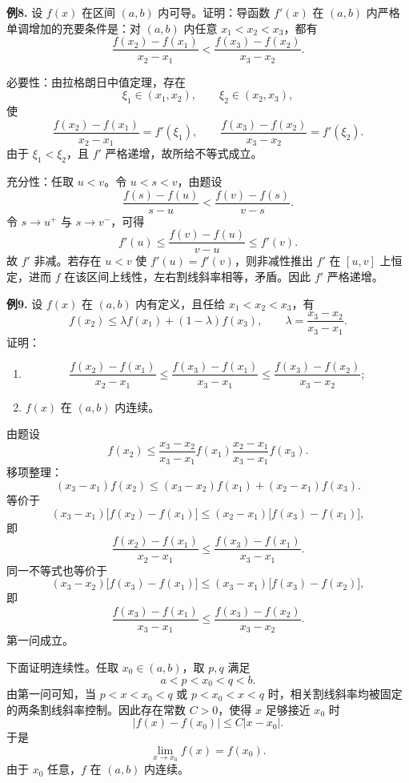 \begin{problemblock}
\textbf{例8.} 设 \(f(x)\) 在区间 \((a,b)\) 内可导。证明：导函数 \(f'(x)\) 在 \((a,b)\) 内严格单调增加的充要条件是：对 \((a,b)\) 内任意 \(x_1<x_2<x_3\)，都有
\[
\frac{f(x_2)-f(x_1)}{x_2-x_1}
<
\frac{f(x_3)-f(x_2)}{x_3-x_2}.
\]
\end{problemblock}
\begin{solutionblock}
必要性：由拉格朗日中值定理，存在
\[
\xi_1\in(x_1,x_2),\qquad \xi_2\in(x_2,x_3),
\]
使
\[
\frac{f(x_2)-f(x_1)}{x_2-x_1}=f'(\xi_1),\qquad
\frac{f(x_3)-f(x_2)}{x_3-x_2}=f'(\xi_2).
\]
由于 \(\xi_1<\xi_2\)，且 \(f'\) 严格递增，故所给不等式成立。

充分性：任取 \(u<v\)。令 \(u<s<v\)，由题设
\[
\frac{f(s)-f(u)}{s-u}
<
\frac{f(v)-f(s)}{v-s}.
\]
令 \(s\to u^+\) 与 \(s\to v^-\)，可得
\[
f'(u)\le\frac{f(v)-f(u)}{v-u}\le f'(v).
\]
故 \(f'\) 非减。若存在 \(u<v\) 使 \(f'(u)=f'(v)\)，则非减性推出 \(f'\) 在 \([u,v]\) 上恒定，进而 \(f\) 在该区间上线性，左右割线斜率相等，矛盾。因此 \(f'\) 严格递增。
\end{solutionblock}

\begin{problemblock}
\textbf{例9.} 设 \(f(x)\) 在 \((a,b)\) 内有定义，且任给 \(x_1<x_2<x_3\)，有
\[
f(x_2)\le \lambda f(x_1)+(1-\lambda)f(x_3),
\qquad
\lambda=\frac{x_3-x_2}{x_3-x_1}.
\]
证明：
\begin{enumerate}[label=(\arabic*), leftmargin=2.2em]
\item
\[
\frac{f(x_2)-f(x_1)}{x_2-x_1}
\le
\frac{f(x_3)-f(x_1)}{x_3-x_1}
\le
\frac{f(x_3)-f(x_2)}{x_3-x_2};
\]
\item \(f(x)\) 在 \((a,b)\) 内连续。
\end{enumerate}
\end{problemblock}
\begin{solutionblock}
由题设
\[
f(x_2)\le
\frac{x_3-x_2}{x_3-x_1}f(x_1)
\frac{x_2-x_1}{x_3-x_1}f(x_3).
\]
移项整理：
\[
(x_3-x_1)f(x_2)
\le (x_3-x_2)f(x_1)+(x_2-x_1)f(x_3).
\]
等价于
\[
(x_3-x_1)\bigl[f(x_2)-f(x_1)\bigr]
\le
(x_2-x_1)\bigl[f(x_3)-f(x_1)\bigr],
\]
即
\[
\frac{f(x_2)-f(x_1)}{x_2-x_1}
\le
\frac{f(x_3)-f(x_1)}{x_3-x_1}.
\]
同一不等式也等价于
\[
(x_3-x_2)\bigl[f(x_3)-f(x_1)\bigr]
\le
(x_3-x_1)\bigl[f(x_3)-f(x_2)\bigr],
\]
即
\[
\frac{f(x_3)-f(x_1)}{x_3-x_1}
\le
\frac{f(x_3)-f(x_2)}{x_3-x_2}.
\]
第一问成立。

下面证明连续性。任取 \(x_0\in(a,b)\)，取 \(p,q\) 满足
\[
a<p<x_0<q<b.
\]
由第一问可知，当 \(p<x<x_0<q\) 或 \(p<x_0<x<q\) 时，相关割线斜率均被固定的两条割线斜率控制。因此存在常数 \(C>0\)，使得 \(x\) 足够接近 \(x_0\) 时
\[
|f(x)-f(x_0)|\le C|x-x_0|.
\]
于是
\[
\lim_{x\to x_0}f(x)=f(x_0).
\]
由于 \(x_0\) 任意，\(f\) 在 \((a,b)\) 内连续。
\end{solutionblock}

